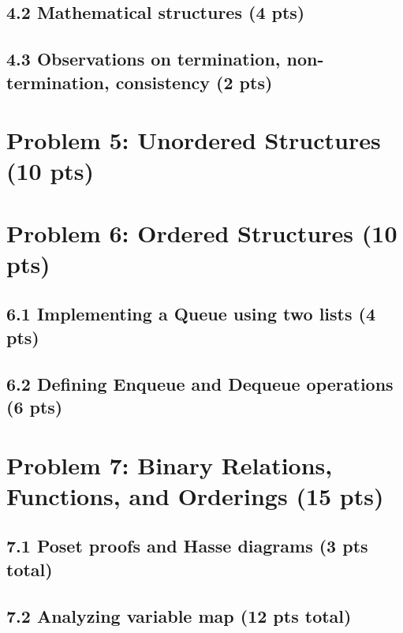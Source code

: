\documentclass[11pt]{article}
\begin{document}
\subsection*{4.2 Mathematical structures (4 pts)}

\subsection*{4.3 Observations on termination, non-termination, consistency (2 pts)}

\newpage
\section{Problem 5: Unordered Structures (10 pts)}

\newpage
\section{Problem 6: Ordered Structures (10 pts)}

\subsection*{6.1 Implementing a Queue using two lists (4 pts)}

\subsection*{6.2 Defining Enqueue and Dequeue operations (6 pts)}

\newpage
\section{Problem 7: Binary Relations, Functions, and Orderings (15 pts)}

\subsection*{7.1 Poset proofs and Hasse diagrams (3 pts total)}

\subsection*{7.2 Analyzing variable map (12 pts total)}
\end{document}
